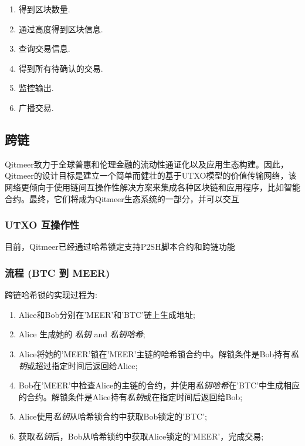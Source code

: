 \documentclass[a4paper,11pt]{article}
\begin{document}
   \begin{enumerate}
    \item  得到区块数量.
    \item  通过高度得到区块信息.
    \item  查询交易信息.
    \item  得到所有待确认的交易.
    \item  监控输出.
    \item  广播交易.
   \end{enumerate}


\subsection{跨链}

Qitmeer致力于全球普惠和伦理金融的流动性通证化以及应用生态构建。因此，Qitmeer的设计目标是建立一个简单而健壮的基于UTXO模型的价值传输网络，该网络更倾向于使用链间互操作性解决方案来集成各种区块链和应用程序，比如智能合约。最终，它们将成为Qitmeer生态系统的一部分，并可以交互

\subsubsection{UTXO 互操作性}
目前，Qitmeer已经通过哈希锁定支持P2SH脚本合约和跨链功能

\subsubsection*{流程 (BTC 到 MEER)}

跨链哈希锁的实现过程为:

\begin{enumerate}
	\item  Alice和Bob分别在'MEER'和'BTC'链上生成地址;

	\item Alice 生成她的 \textit{私钥} and \textit{私钥哈希};

	\item Alice将她的'MEER'锁在'MEER'主链的哈希锁合约中。解锁条件是Bob持有\textit{私钥}或超过指定时间后返回给Alice;

	\item Bob在'MEER'中检查Alice的主链的合约，并使用\textit{私钥哈希}在'BTC'中生成相应的合约。解锁条件是Alice持有\textit{私钥}或在指定时间后返回给Bob;

	\item Alice使用\textit{私钥}从哈希锁合约中获取Bob锁定的'BTC';

	\item 获取\textit{私钥}后，Bob从哈希锁约中获取Alice锁定的'MEER'，完成交易;
\end{enumerate}
\end{document}
